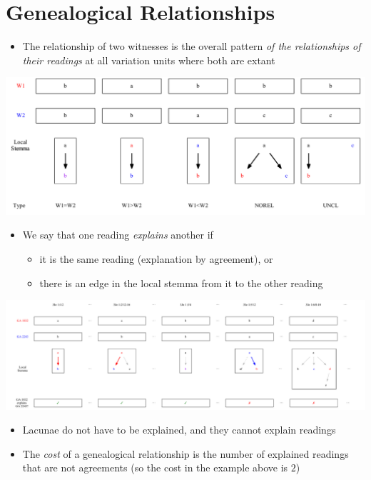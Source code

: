 \documentclass[10pt]{beamer}
\begin{document}
	\section*{Genealogical Relationships}
	\begin{frame}
		\begin{itemize}
			\item The relationship of two witnesses is the overall pattern \emph{of the relationships of their readings} at all variation units where both are extant
		\end{itemize}
		\begin{center}
			\includegraphics[width=\textwidth]{../img/genealogical-relationships.pdf}
		\end{center}
	\end{frame}
	\begin{frame}
		\begin{itemize}
			\item We say that one reading \emph{explains} another if
			\begin{itemize}
				\item it is the same reading (explanation by agreement), or
				\item there is an edge in the local stemma from it to the other reading
			\end{itemize}
		\end{itemize}
		\begin{center}
			\includegraphics[width=\textwidth]{../img/explained-readings.pdf}
		\end{center}
		\begin{itemize}
			\item Lacunae do not have to be explained, and they cannot explain readings
			\item The \emph{cost} of a genealogical relationship is the number of explained readings that are not agreements (so the cost in the example above is $2$)
		\end{itemize}
	\end{frame}
\end{document}
